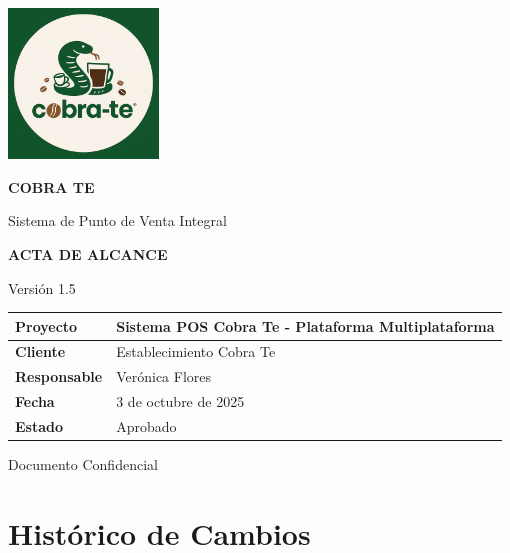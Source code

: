 \documentclass[12pt,letterpaper]{article}
\begin{document}
\begin{titlepage}
    \centering
    \vspace*{1cm}
    
    \includegraphics[width=4cm]{Logo.png}
    
    \vspace{1cm}
    {\color{cobrablue}\Huge\textbf{COBRA TE}}
    
    \vspace{0.5cm}
    {\color{cobraorange}\Large Sistema de Punto de Venta Integral}
    
    \vspace{2cm}
    {\color{cobragray}\LARGE\textbf{ACTA DE ALCANCE}}
    
    \vspace{1cm}
    {\color{cobragray}\large Versión 1.5}
    
    \vspace{2cm}
    \begin{tabular}{|p{4cm}|p{8cm}|}
        \hline
        \rowcolor{cobrablue!20}
        \textbf{Proyecto} & Sistema POS Cobra Te - Plataforma Multiplataforma \\
        \hline
        \textbf{Cliente} & Establecimiento Cobra Te \\
        \hline
        \textbf{Responsable} & Verónica Flores \\
        \hline
        \textbf{Fecha} & 3 de octubre de 2025 \\
        \hline
        \textbf{Estado} & Aprobado \\
        \hline
    \end{tabular}
    
    \vfill
    {\color{cobragray}\large Documento Confidencial}
    
\end{titlepage}

\newpage

\tableofcontents
\newpage

\section*{Histórico de Cambios}
\end{document}

